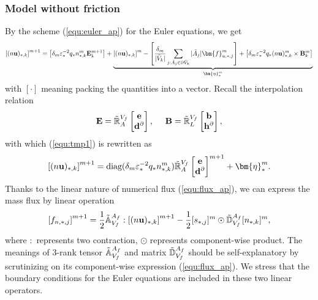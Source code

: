 \documentclass{article}
\begin{document}
\subsubsection{Model without friction}
By the scheme (\ref{equ:euler_ap}) for the Euler equations, we get 
\begin{equation} \label{equ:tmp1}
    \left[(n\mathbf{u})_{*,k}\right]^{m+1} = \left[\delta_m \varepsilon^{-2}_* q_* n^m_{*,k}\mathbf{E}^{m+1}_k \right] + \underbrace{\left[(n\mathbf{u})_{*,k}\right]^{m} - \left[\frac{\delta_m}{|{\Tilde{V}}_k|}\sum_{j:\Tilde{A}_j\in\partial\Tilde{V}_k}|\Tilde{A}_j|\bm{f}^m_{u,*,j}\right] + \left[\delta_m \varepsilon^{-2}_* q_*(n\mathbf{u})^m_{*,k} \times \mathbf{B}^m_{k}\right]}_{\bm{\eta}^m_*}
\end{equation}
with $[\cdot]$ meaning packing the quantities into a vector. Recall the interpolation relation
\begin{equation*}
    \mathbf{E} = \Tilde{\mathbb{R}}^{V_f}_{A}
    \begin{bmatrix}
    \mathbf{e} \\
    \mathbf{d}^\partial 
    \end{bmatrix},
    \ \ \ \ 
    \mathbf{B} = \Tilde{\mathbb{R}}^{V_f}_{L}
    \begin{bmatrix}
    \mathbf{b} \\
    \mathbf{h}^\partial 
    \end{bmatrix},
\end{equation*}
with which (\ref{equ:tmp1}) is rewritten as
\begin{equation} \label{equ:tmp2}
    \left[(n\mathbf{u})_{*,k}\right]^{m+1} = \text{diag}(\delta_m \varepsilon^{-2}_* q_* n^m_{*,k}) \Tilde{\mathbb{R}}^{V_f}_{A} 
    \begin{bmatrix}
    \mathbf{e} \\
    \mathbf{d}^\partial 
    \end{bmatrix}^{m+1} + \bm{\eta}^m_*.
\end{equation}
Thanks to the linear nature of numerical flux (\ref{equ:flux_ap}), we can express the mass flux by linear operation 
\begin{equation} \label{equ:tmp3}
    \left[f_{n,*,j}\right]^{m+1} = \frac{1}{2} \Tilde{\mathbb{A}}_{V_f}^{A_f} :  \left[(n\mathbf{u})_{*,k}\right]^{m+1} - \frac{1}{2} [s_{*,j}]^m \odot \Tilde{\mathbb{D}}_{V_f}^{A_f} [n_{*,k}]^m,
\end{equation}
where $:$ represents two contraction, $\odot$ represents component-wise product. The meanings of 3-rank tensor $\Tilde{\mathbb{A}}_{V_f}^{A_f}$ and matrix $\Tilde{\mathbb{D}}_{V_f}^{A_f}$ should be self-explanatory by scrutinizing on its component-wise expression (\ref{equ:flux_ap}). We stress that the boundary conditions for the Euler equations are included in these two linear operators. 
\end{document}
